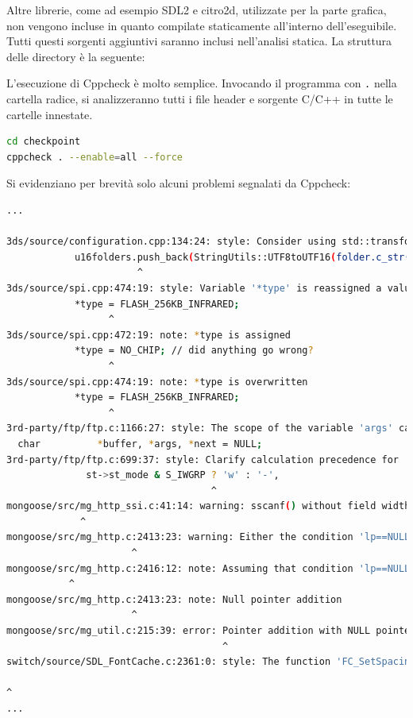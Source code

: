 \documentclass{article}
\begin{document}
Altre librerie, come ad esempio SDL2 e citro2d, utilizzate per la parte grafica,
non vengono incluse in quanto compilate staticamente all'interno
dell'eseguibile. \\

Tutti questi sorgenti aggiuntivi saranno inclusi nell'analisi statica. La
struttura delle directory è la seguente:


L'esecuzione di Cppcheck è molto semplice. Invocando il programma con \texttt{.}
nella cartella radice, si analizzeranno tutti i file header e sorgente C/C++
in tutte le cartelle innestate.

\begin{lstlisting}[language=bash]
cd checkpoint
cppcheck . --enable=all --force
\end{lstlisting}

Si evidenziano per brevità solo alcuni problemi segnalati da Cppcheck:

\begin{lstlisting}[language=bash]
...

3ds/source/configuration.cpp:134:24: style: Consider using std::transform algorithm instead of a raw loop. [useStlAlgorithm]
            u16folders.push_back(StringUtils::UTF8toUTF16(folder.c_str()));
                       ^
3ds/source/spi.cpp:474:19: style: Variable '*type' is reassigned a value before the old one has been used. [redundantAssignment]
            *type = FLASH_256KB_INFRARED;
                  ^
3ds/source/spi.cpp:472:19: note: *type is assigned
            *type = NO_CHIP; // did anything go wrong?
                  ^
3ds/source/spi.cpp:474:19: note: *type is overwritten
            *type = FLASH_256KB_INFRARED;
                  ^
3rd-party/ftp/ftp.c:1166:27: style: The scope of the variable 'args' can be reduced. [variableScope]
  char          *buffer, *args, *next = NULL;
3rd-party/ftp/ftp.c:699:37: style: Clarify calculation precedence for '&' and '?'. [clarifyCalculation]
              st->st_mode & S_IWGRP ? 'w' : '-',
                                    ^
mongoose/src/mg_http_ssi.c:41:14: warning: sscanf() without field width limits can crash with huge input data. [invalidscanf]
             ^
mongoose/src/mg_http.c:2413:23: warning: Either the condition 'lp==NULL' is redundant or there is pointer arithmetic with NULL pointer. [nullPointerArithmeticRedundantCheck]
                      ^
mongoose/src/mg_http.c:2416:12: note: Assuming that condition 'lp==NULL' is not redundant
           ^
mongoose/src/mg_http.c:2413:23: note: Null pointer addition
                      ^
mongoose/src/mg_util.c:215:39: error: Pointer addition with NULL pointer. [nullPointerArithmetic]
                                      ^
switch/source/SDL_FontCache.c:2361:0: style: The function 'FC_SetSpacing' is never used. [unusedFunction]

^
...
\end{lstlisting}
\end{document}
